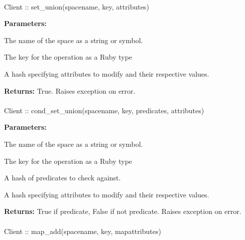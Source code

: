 \paragraph{}
\label{api:ruby:set_union}
\begin{ccode}
Client :: set_union(spacename, key, attributes)
\end{ccode}
\funcdesc 

\noindent\textbf{Parameters:}
\begin{description}[labelindent=\widthof{{\code{attributes}}},leftmargin=*,noitemsep,nolistsep,align=right]
\item[\code{spacename}] The name of the space as a string or symbol.
\item[\code{key}] The key for the operation as a Ruby type
\item[\code{attributes}] A hash specifying attributes to modify and their respective values.
\end{description}

\noindent\textbf{Returns:}
True.  Raises exception on error.

\paragraph{}
\label{api:ruby:cond_set_union}
\begin{ccode}
Client :: cond_set_union(spacename, key, predicates, attributes)
\end{ccode}
\funcdesc 

\noindent\textbf{Parameters:}
\begin{description}[labelindent=\widthof{{\code{predicates}}},leftmargin=*,noitemsep,nolistsep,align=right]
\item[\code{spacename}] The name of the space as a string or symbol.
\item[\code{key}] The key for the operation as a Ruby type
\item[\code{predicates}] A hash of predicates to check against.
\item[\code{attributes}] A hash specifying attributes to modify and their respective values.
\end{description}

\noindent\textbf{Returns:}
True if predicate, False if not predicate.  Raises exception on error.

\paragraph{}
\label{api:ruby:map_add}
\begin{ccode}
Client :: map_add(spacename, key, mapattributes)
\end{ccode}
\funcdesc 

